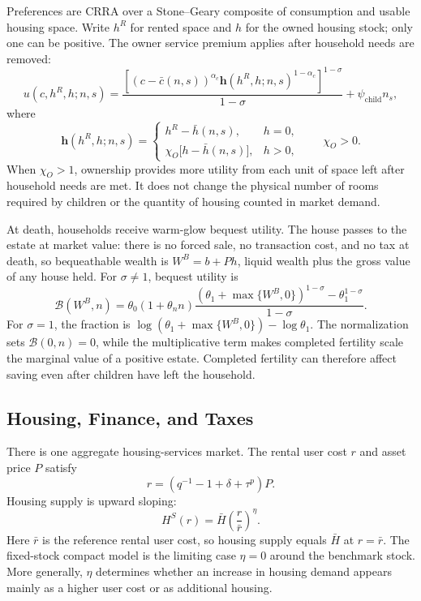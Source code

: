 \documentclass[11pt]{article}
\theoremstyle{definition}
\newcommand{\1}{\mathbf 1}
\newcommand{\Bcal}{\mathcal B}
\begin{document}
Preferences are CRRA over a Stone--Geary composite of consumption and usable
housing space. Write $h^R$ for rented space and $h$ for the owned housing stock;
only one can be positive. The owner service premium applies after household
needs are removed:
\begin{equation}
u(c,h^R,h;n,s)
=
\frac{
\left[
(c-\bar c(n,s))^{\alpha_c}
\mathbf h(h^R,h;n,s)^{1-\alpha_c}
\right]^{1-\sigma}
}{1-\sigma}
+\psi_{\mathrm{child}}n_s,
\label{eq:quant_flow_utility}
\end{equation}
where
\begin{equation}
\mathbf h(h^R,h;n,s)=
\begin{cases}
h^R-\bar h(n,s), & h=0,\\
\chi_O\big[h-\bar h(n,s)\big], & h>0,
\end{cases}
\qquad
\chi_O>0.
\label{eq:quant_housing_services}
\end{equation}
When $\chi_O>1$, ownership provides more utility from each unit of space left
after household needs are met. It does not change the physical number of rooms
required by children or the quantity of housing counted in market demand.

At death, households receive warm-glow bequest utility. The house passes to
the estate at market value: there is no forced sale, no transaction cost,
and no tax at death, so bequeathable wealth is $W^B=b+Ph$, liquid wealth
plus the gross value of any house held. For $\sigma\neq1$, bequest utility is
\begin{equation}
\Bcal(W^B,n)
=
\theta_0(1+\theta_n n)
\frac{
(\theta_1+\max\{W^B,0\})^{1-\sigma}-\theta_1^{1-\sigma}
}{1-\sigma}.
\label{eq:quant_bequest}
\end{equation}
For $\sigma=1$, the fraction is
$\log(\theta_1+\max\{W^B,0\})-\log\theta_1$.
The normalization sets $\Bcal(0,n)=0$, while the multiplicative term makes
completed fertility scale the marginal value of a positive estate.
Completed fertility can therefore affect saving even after children have
left the household.

\subsection{Housing, Finance, and Taxes}

There is one aggregate housing-services market. The rental user cost $r$ and
asset price $P$ satisfy
\begin{equation}
r=(q^{-1}-1+\delta+\tau^p)P.
\label{eq:quant_user_cost}
\end{equation}
Housing supply is upward sloping:
\begin{equation}
H^S(r)=\bar H\left(\frac{r}{\bar r}\right)^\eta.
\label{eq:quant_supply}
\end{equation}
Here $\bar r$ is the reference rental user cost, so housing supply equals
$\bar H$ at $r=\bar r$.
The fixed-stock compact model is the limiting case $\eta=0$ around the
benchmark stock. More generally, $\eta$ determines whether an increase in
housing demand appears mainly as a higher user cost or as additional housing.
\end{document}
